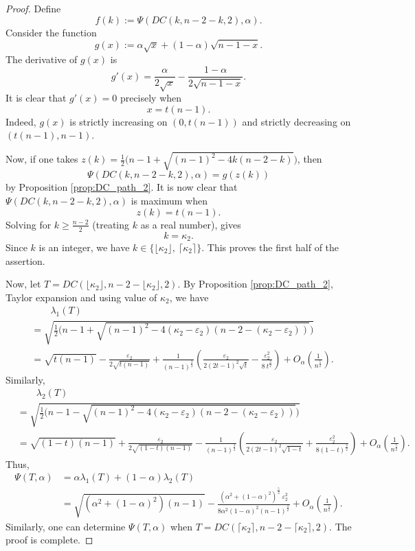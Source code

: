 \documentclass[10pt,a4paper]{amsart}
\begin{document}
\begin{proof}
Define 
\[f(k) := \Psi(DC(k,n-2-k,2), \alpha).\]
Consider the function
\[ g(x):= \alpha\sqrt{x} + (1-\alpha)\sqrt{n-1-x}.\]
The derivative of $g(x)$ is
\[ g'(x)=\frac{\alpha}{2\sqrt{x}}-\frac{1-\alpha}{2\sqrt{n-1-x}}.\]
It is clear that $g'(x)=0$ precisely when 
\[ x = t(n-1).\]
Indeed, $g(x)$ is strictly increasing on $(0,t(n-1))$ and strictly decreasing on $(t(n-1), n-1)$.

Now, if one takes $z(k) = \frac{1}{2}\big(n-1+\sqrt{(n-1)^2 - 4k(n-2-k)} \big)$, then 
\[ \Psi(DC(k,n-2-k,2), \alpha) = g(z(k))\]
by Proposition \ref{prop:DC_path_2}. It is now clear that $\Psi(DC(k,n-2-k,2), \alpha)$ is maximum when 
\[ z(k) = t(n-1).\]
Solving for $k\ge \frac{n-2}{2}$ (treating $k$ as a real number), gives
\[ k = \kappa_2.\]
Since $k$ is an integer, we have $k\in \{\lfloor\kappa_2\rfloor, \ \lceil \kappa_2\rceil\}$. This proves the first half of the assertion.

Now, let $T = DC(\lfloor\kappa_2\rfloor, n-2-\lfloor\kappa_2\rfloor, 2)$. By Proposition \ref{prop:DC_path_2}, Taylor expansion and using value of $\kappa_2$, we have 
\begin{align*}
   & \qquad \lambda_1(T) \\
   & = \sqrt{ \frac{1}{2}\big(n-1+\sqrt{(n-1)^2 - 4(\kappa_2 -\varepsilon_2)(n-2-(\kappa_2-\varepsilon_2))} \big)} \\
   & = \sqrt{t(n-1)} - \frac{\varepsilon_2}{2\sqrt{t(n-1)}}+\frac{1}{(n-1)^{\frac{3}{2}}}\left(\frac{\varepsilon_2}{2(2t-1)^2\sqrt{t}}-\frac{\varepsilon_2^2}{8\ t^{\frac{3}{2}}}\right) + O_\alpha\left(\frac{1}{n^{\frac{5}{2}}}\right).
\end{align*}
Similarly, 
\begin{align*}
  & \qquad \lambda_2(T) \\
  & = \sqrt{ \frac{1}{2}\big(n-1 - \sqrt{(n-1)^2 - 4(\kappa_2 -\varepsilon_2)(n-2-(\kappa_2-\varepsilon_2))} \big)} \\
   & = \sqrt{(1-t)(n-1)} + \frac{\varepsilon_2}{2\sqrt{(1-t)(n-1)}}-\frac{1}{(n-1)^{\frac{3}{2}}}\left(\frac{\varepsilon_2}{2(2t-1)^2\sqrt{1-t}}+\frac{\varepsilon_2^2}{8(1-t)^{\frac{3}{2}}}\right) + O_\alpha\left(\frac{1}{n^{\frac{5}{2}}}\right).
\end{align*}
Thus, 
\begin{align*}
  \Psi(T, \alpha) & = \alpha \lambda_1(T) + (1-\alpha)\lambda_2(T) \\
  & = \sqrt{(\alpha^2+(1-\alpha)^2)(n-1)}-\frac{(\alpha^2 + (1-\alpha)^2)^{\frac{5}{2}}\ \varepsilon_2^2}{8\alpha^2(1-\alpha)^2(n-1)^{\frac{3}{2}}} + O_\alpha\left(\frac{1}{n^{\frac{5}{2}}}\right). 
\end{align*}
Similarly, one can determine $\Psi(T, \alpha)$ when $T = DC(\lceil\kappa_2\rceil, n-2-\lceil\kappa_2\rceil, 2)$. The proof is complete.
\end{proof}
\end{document}
